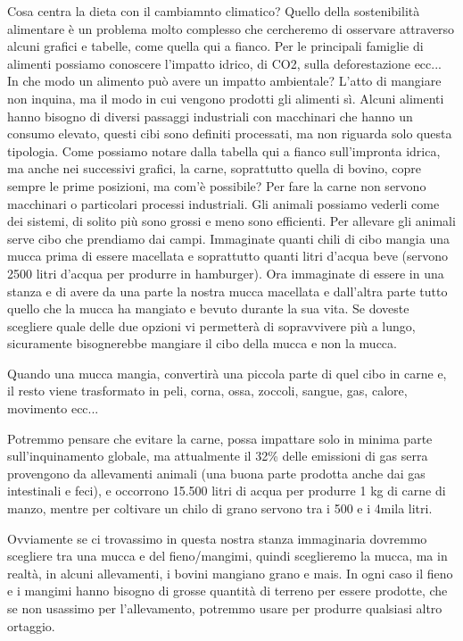 \documentclass[12pt]{book} %
\begin{document}
Cosa centra la dieta con il cambiamnto climatico? Quello della sostenibilità alimentare è un problema molto complesso che cercheremo di osservare attraverso alcuni grafici e tabelle, come quella qui a fianco. Per le principali famiglie di alimenti possiamo conoscere l'impatto idrico, di CO2, sulla deforestazione ecc... In che modo un alimento può avere un impatto ambientale? L'atto di mangiare non inquina, ma il modo in cui vengono prodotti gli alimenti sì. Alcuni alimenti hanno bisogno di diversi passaggi industriali con macchinari che hanno un consumo elevato, questi cibi sono definiti processati, ma non riguarda solo questa tipologia. Come possiamo notare dalla tabella qui a fianco sull'impronta idrica, ma anche nei successivi grafici, la carne, soprattutto quella di bovino, copre sempre le prime posizioni, ma com'è possibile? Per fare la carne non servono macchinari o particolari processi industriali.
Gli animali possiamo vederli come dei sistemi, di solito più sono grossi e meno sono efficienti. Per allevare gli animali serve cibo che prendiamo dai campi. Immaginate quanti chili di cibo mangia una mucca prima di essere macellata e soprattutto quanti litri d'acqua beve
(servono 2500 litri d'acqua per produrre in hamburger). Ora immaginate di essere in una stanza e di avere da una parte
la nostra mucca macellata e dall'altra parte tutto quello che la mucca ha mangiato e bevuto durante la sua vita.
Se doveste scegliere quale delle due opzioni vi permetterà di sopravvivere più a lungo, sicuramente bisognerebbe mangiare il cibo della mucca e non la mucca.

Quando una mucca mangia, convertirà una piccola parte di quel cibo in carne e, il resto viene trasformato in peli, corna, ossa, zoccoli, sangue, gas, calore, movimento ecc...

Potremmo pensare che evitare la carne, possa impattare solo in minima parte sull'inquinamento globale, ma attualmente il 32\% delle emissioni di gas serra provengono da allevamenti animali
(una buona parte prodotta anche dai gas intestinali e feci), e occorrono 15.500 litri di acqua per produrre 1 kg di carne di manzo, mentre per coltivare un chilo di grano servono tra i 500 e i 4mila litri.

Ovviamente se ci trovassimo in questa nostra stanza immaginaria dovremmo scegliere tra una mucca e del fieno/mangimi,
quindi sceglieremo la mucca, ma in realtà, in alcuni allevamenti, i bovini mangiano grano e mais.
In ogni caso il fieno e i mangimi hanno bisogno di grosse quantità di terreno per essere prodotte, che se non usassimo per
l'allevamento, potremmo usare per produrre qualsiasi altro ortaggio.
\end{document}
